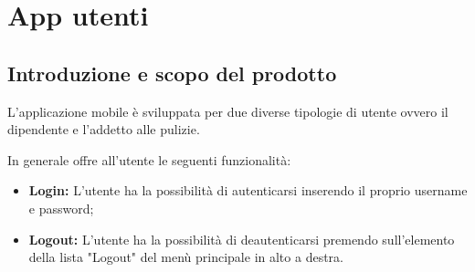 \section{App utenti}

\subsection{Introduzione e scopo del prodotto}
L'applicazione mobile è sviluppata per due diverse tipologie di utente ovvero il dipendente e l'addetto alle pulizie.

In generale offre all'utente le seguenti funzionalità:
\begin{itemize}
	\item \textbf{Login:} L'utente ha la possibilità di autenticarsi inserendo il proprio username e password; \\
	\item \textbf{Logout:} L'utente ha la possibilità di deautenticarsi premendo sull'elemento della lista "Logout" del menù principale in alto a destra. \\
\end{itemize}

